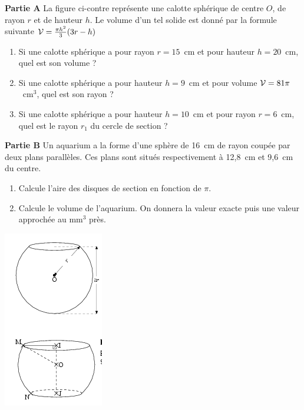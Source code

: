 

\begin{minipage}{0.68\linewidth}
\textbf{Partie A} La figure ci-contre
représente une calotte sphérique de centre $O$, de rayon $r$ et de
hauteur $h$. Le volume d'un tel solide est donné par la formule
suivante
${\cal V}=\frac{\pi h^2}{3}(3r-h)$
\begin{enumerate}
\item Si une calotte sphérique a pour rayon $r=15$~cm et pour hauteur
$h=20$~cm, quel est son volume ?
\item Si une calotte sphérique a pour hauteur $h=9$~cm et pour volume
${\cal V}=81\pi$~cm$^3$, quel est son rayon ?
\item Si une calotte sphérique a pour hauteur $h=10$~cm et pour rayon
$r=6$~cm, quel est le rayon $r_1$ du cercle de section ?
\end{enumerate}

\textbf{Partie B} Un aquarium a la forme
d'une sphère de 16~cm de rayon coupée par deux plans
parallèles. Ces plans sont situés respectivement à 12,8~cm et
9,6~cm du centre.
\begin{enumerate}
\item Calcule l'aire des disques de section en fonction de $\pi$.
\item Calcule le volume de l'aquarium. On donnera la valeur exacte
puis une valeur approchée au mm$^3$ près.
\end{enumerate}
\end{minipage}
\hfill
\begin{minipage}{0.28\linewidth}
\includegraphics[scale=1]{RepS-43.png} 
\end{minipage}

